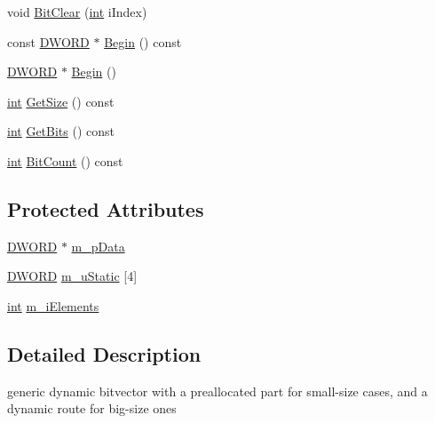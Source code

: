 \begin{DoxyCompactItemize}
\item 
void \hyperlink{classCSphBitvec_a3cbc263d886e415b0c6af860fcec5c78}{Bit\-Clear} (\hyperlink{sphinxexpr_8cpp_a4a26e8f9cb8b736e0c4cbf4d16de985e}{int} i\-Index)
\item 
const \hyperlink{sphinxstd_8h_a798af1e30bc65f319c1a246cecf59e39}{D\-W\-O\-R\-D} $\ast$ \hyperlink{classCSphBitvec_adab2a14ee04ca45a89c3e89571b28e51}{Begin} () const 
\item 
\hyperlink{sphinxstd_8h_a798af1e30bc65f319c1a246cecf59e39}{D\-W\-O\-R\-D} $\ast$ \hyperlink{classCSphBitvec_a9ebe1f7853ddf18b3585985f8e8d623e}{Begin} ()
\item 
\hyperlink{sphinxexpr_8cpp_a4a26e8f9cb8b736e0c4cbf4d16de985e}{int} \hyperlink{classCSphBitvec_a21798193008a9f722c98f8920398fa92}{Get\-Size} () const 
\item 
\hyperlink{sphinxexpr_8cpp_a4a26e8f9cb8b736e0c4cbf4d16de985e}{int} \hyperlink{classCSphBitvec_ae26b6e0ecb3a60506f1e0d4564d6d199}{Get\-Bits} () const 
\item 
\hyperlink{sphinxexpr_8cpp_a4a26e8f9cb8b736e0c4cbf4d16de985e}{int} \hyperlink{classCSphBitvec_a140b2e940c78fcfa6073a90881301835}{Bit\-Count} () const 
\end{DoxyCompactItemize}
\subsection*{Protected Attributes}
\begin{DoxyCompactItemize}
\item 
\hyperlink{sphinxstd_8h_a798af1e30bc65f319c1a246cecf59e39}{D\-W\-O\-R\-D} $\ast$ \hyperlink{classCSphBitvec_a0f3d79323dd87e74dcd8b09edf3f30fe}{m\-\_\-p\-Data}
\item 
\hyperlink{sphinxstd_8h_a798af1e30bc65f319c1a246cecf59e39}{D\-W\-O\-R\-D} \hyperlink{classCSphBitvec_ac70b5fec98f2067a35cbade1b7518457}{m\-\_\-u\-Static} \mbox{[}4\mbox{]}
\item 
\hyperlink{sphinxexpr_8cpp_a4a26e8f9cb8b736e0c4cbf4d16de985e}{int} \hyperlink{classCSphBitvec_a7f964663c4896dfa70bc85ff68017515}{m\-\_\-i\-Elements}
\end{DoxyCompactItemize}


\subsection{Detailed Description}
generic dynamic bitvector with a preallocated part for small-\/size cases, and a dynamic route for big-\/size ones 

